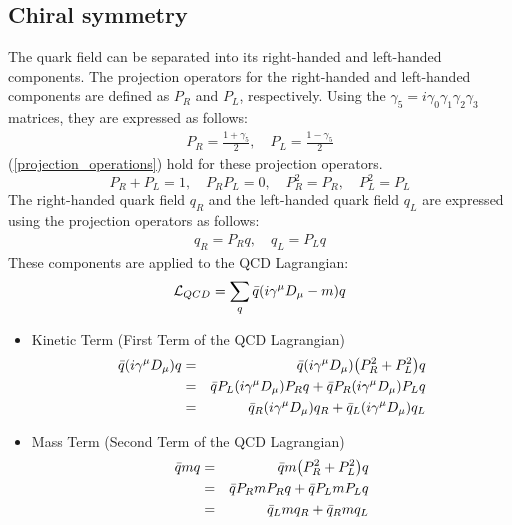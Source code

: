     \subsection{Chiral symmetry}
    \label{Intro:Chiral_symmetry}  
        The quark field can be separated into its right-handed and left-handed components. The projection operators for the right-handed and left-handed components are defined as $P_R$ and $P_L$, respectively. Using the $\gamma_5 = i \gamma_0 \gamma_1 \gamma_2 \gamma_3 $ matrices, they are expressed as follows:    
        \begin{eqnarray}
            P_R = \frac{1+\gamma_5}{2}, \quad P_L = \frac{1-\gamma_5}{2}
            \label{projection_operations}
        \end{eqnarray}
        (\ref{projection_operations}) hold for these projection operators.
        \begin{equation}
            P_R + P_L = 1, \quad P_R P_L = 0, \quad P_R^2 = P_R, \quad P_L^2 = P_L  
        \end{equation}
        The right-handed quark field $q_R$ and the left-handed quark field $q_L$ are expressed using the projection operators as follows:  
        \begin{eqnarray}  
            q_R = P_R q, \quad q_L = P_L q
        \end{eqnarray}  
        These components are applied to the QCD Lagrangian:  
        \begin{eqnarray}  
            \mathcal{L}_{QCD} = \sum_q \bar{q}\qty(i\gamma^\mu D_\mu - m)q
        \end{eqnarray}  
        
        \begin{itemize}
            \item Kinetic Term (First Term of the QCD Lagrangian)
                    \begin{eqnarray}  
                        \bar{q}\qty(i\gamma^\mu D_\mu)q &=& \bar{q}\qty(i\gamma^\mu D_\mu)\qty(P_R^2 + P_L^2)q \\  
                        &=& \bar{q} P_L \qty(i\gamma^\mu D_\mu) P_R q + \bar{q} P_R \qty(i\gamma^\mu D_\mu) P_L q \\  
                        &=& \bar{q}_R \qty(i\gamma^\mu D_\mu) q_R + \bar{q}_L \qty(i\gamma^\mu D_\mu) q_L  
                    \end{eqnarray}  
            
            \item Mass Term (Second Term of the QCD Lagrangian)
                    \begin{eqnarray}  
                        \bar{q}m q &=& \bar{q} m \qty(P_R^2 + P_L^2)q \\  
                        &=& \bar{q} P_R m P_R q + \bar{q} P_L m P_L q \\  
                        &=& \bar{q}_L m q_R + \bar{q}_R m q_L
                    \end{eqnarray}  
        \end{itemize}
        
